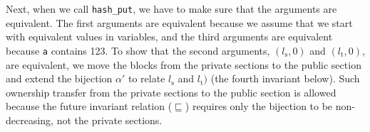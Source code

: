 Next, when we call \texttt{hash\_put}, we have to make sure that the
arguments are equivalent. The first arguments are equivalent because
we assume that we start with equivalent values in variables, and the third arguments
are equivalent because \texttt{a} contains 123.  To show that
the second arguments, $(l_\text{s},0)$ and $(l_\text{t},0)$, are
equivalent, we move the blocks from the private sections to the public
section and extend the bijection $\alpha'$ to relate $l_\text{s}$
and $l_\text{t})$ (the fourth invariant below). Such ownership
transfer from the private sections to the public section is allowed
because the future invariant relation ($\sqsubseteq$) requires
only the bijection to be non-decreasing, not the private
sections.
\begin{center}
\hfill
{}\hfill
{}\hfill
{}
\end{center}

